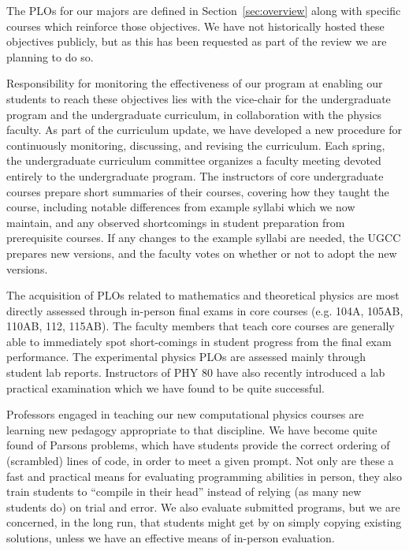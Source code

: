 \documentclass[12pt]{article}
\begin{document}
\noindent
The PLOs for our majors are defined in Section~\ref{sec:overview}
along with specific courses which reinforce those objectives.  We have
not historically hosted these objectives publicly, but as this has
been requested as part of the review we are planning to do
so. 

Responsibility for monitoring the effectiveness of our program at
enabling our students to reach these objectives lies with the
vice-chair for the undergraduate program and the undergraduate
curriculum, in collaboration with the physics faculty.  As part of the
curriculum update, we have developed a new procedure for continuously
monitoring, discussing, and revising the curriculum.  Each spring, the
undergraduate curriculum committee organizes a faculty meeting devoted
entirely to the undergraduate program.  The instructors of core
undergraduate courses prepare short summaries of their courses,
covering how they taught the course, including notable differences
from example syllabi which we now maintain, and any observed
shortcomings in student preparation from prerequisite courses.  If any
changes to the example syllabi are needed, the UGCC prepares new
versions, and the faculty votes on whether or not to adopt the new
versions.

The acquisition of PLOs related to mathematics and theoretical physics
are most directly assessed through in-person final exams in core
courses (e.g. 104A, 105AB, 110AB, 112, 115AB).  The faculty members
that teach core courses are generally able to immediately spot
short-comings in student progress from the final exam performance.
The experimental physics PLOs are assessed mainly through student lab
reports.  Instructors of PHY 80 have also recently introduced a lab
practical examination which we have found to be quite successful.

Professors engaged in teaching our new computational physics courses
are learning new pedagogy appropriate to that discipline.  We have
become quite found of Parsons problems, which have students provide
the correct ordering of (scrambled) lines of code, in order to meet a
given prompt.  Not only are these a fast and practical means for
evaluating programming abilities in person, they also train students
to ``compile in their head'' instead of relying (as many new students
do) on trial and error.  We also evaluate submitted programs, but we
are concerned, in the long run, that students might get by on simply
copying existing solutions, unless we have an effective means of
in-person evaluation.
\end{document}
